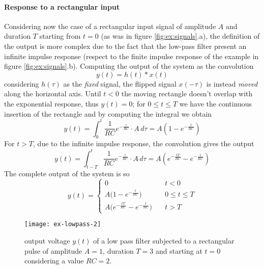 		\paragraph{Response to a rectangular input} Considering now the case of a rectangular input signal of amplitude $A$ and duration $T$ starting from $t=0$ (as was in figure \ref{fig:ex:signals}.a), the definition of the output is more complex due to the fact that the low-pass filter present an infinite impulse response (respect to the finite impulse response of the example in figure \ref{fig:ex:signals}.b). Computing the output of the system as the convolution
		\[ y(t) = h(t)*x(t) \]
		considering $h (\tau)$ as the \textit{fixed} signal, the flipped signal $x(-\tau)$ is instead \textit{moved} along the horizontal axis. Until $t<0$ the moving rectangle doesn't overlap with the exponential response, thus $y(t) = 0$; for $0\leq t\leq T$ we have the continuous insertion of the rectangle and by computing the integral we obtain
		\[ y(t) = \int_0^t \frac 1{RC}e^{-\frac{\tau}{RC}}\cdot A\, d\tau = A\left( 1-e^{-\frac{t}{RC}} \right) \]
		For $t>T$, due to the infinite impulse response, the convolution gives the output
		\[ y(t) = \int_{t-T}^t \frac 1{RC}e^{-\frac{\tau}{RC}}\cdot A\, d\tau = A\left( e^{-\frac{tT}{RC}} - e^{-\frac{t}{RC}} \right) \]
		The complete output of the system is so
		\[ y(t) = \begin{cases}
			0 \qquad & t < 0 \\
			A \big( 1-e^{-\frac{t}{RC}} \big) & 0 \leq t \leq T \\
			A \big( e^{-\frac{tT}{RC}} - e^{-\frac{t}{RC}}  \big) \quad & t>T
		\end{cases}\]
		\begin{SCfigure}[2][bht]
			\centering \texttt{[image: ex-lowpass-2]}
			\caption{output voltage $y(t)$ of a low pass filter subjected to a rectangular pulse of amplitude $A=1$, duration $T=3$ and starting at $t=0$ considering a value $RC=2$.}
		\end{SCfigure}
		
